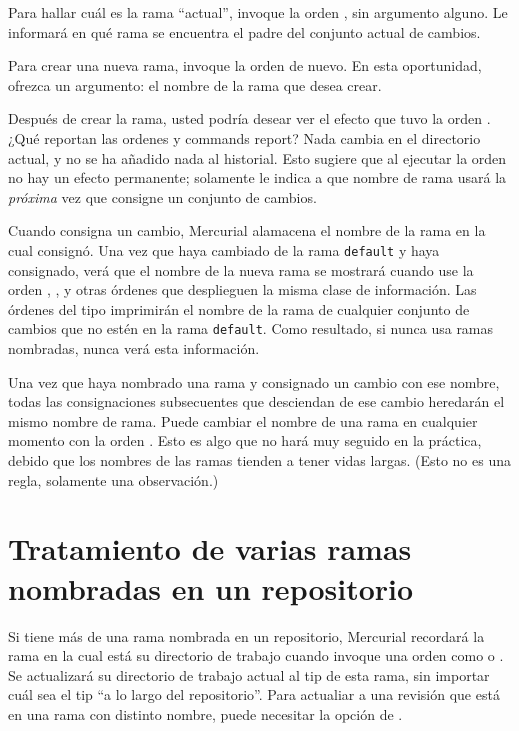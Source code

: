 Para hallar cuál es la rama ``actual'', invoque la orden
, sin argumento alguno. Le informará en qué rama se
encuentra el padre del conjunto actual de cambios.

Para crear una nueva rama, invoque la orden  de
nuevo. En esta oportunidad, ofrezca un argumento: el nombre de la rama
que desea crear.

Después de crear la rama, usted podría desear ver el efecto que tuvo
la orden .  ¿Qué reportan las ordenes  y
 commands report?
Nada cambia en el directorio actual, y no se ha añadido nada al
historial. Esto sugiere que al ejecutar la orden  no hay
un efecto permanente; solamente le indica a que nombre de rama usará
la \emph{próxima} vez que consigne un conjunto de cambios.

Cuando consigna un cambio, Mercurial alamacena el nombre de la rama en
la cual consignó.  Una vez que haya cambiado de la rama \texttt{default}
y haya consignado, verá que el nombre de la nueva rama se mostrará
cuando use la orden , , y otras órdenes que
desplieguen la misma clase de información.
Las órdenes del tipo  imprimirán el nombre de la rama de
cualquier conjunto de cambios que no estén en la rama
\texttt{default}. Como resultado, si nunca usa ramas nombradas, nunca
verá esta información.

Una vez que haya nombrado una rama y consignado un cambio con ese
nombre, todas las consignaciones subsecuentes que desciendan de ese
cambio heredarán el mismo nombre de rama. Puede cambiar el nombre de
una rama en cualquier momento con la orden .  
Esto es algo que no hará muy seguido en la práctica, debido que los
nombres de las ramas tienden a tener vidas largas.  (Esto no es una
regla, solamente una observación.)

\section{Tratamiento de varias ramas nombradas en un repositorio}

Si tiene más de una rama nombrada en un repositorio, Mercurial
recordará la rama en la cual está su directorio de trabajo cuando
invoque una orden como  o .  Se
actualizará su directorio de trabajo actual al tip de esta rama, sin
importar cuál sea el tip ``a lo largo del repositorio''.  Para
actualiar a una revisión que está en una rama con distinto nombre,
puede necesitar la opción  de .

